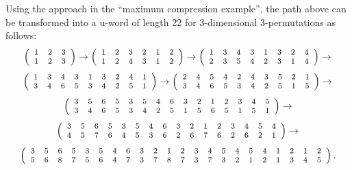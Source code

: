 \documentclass[12pt]{article}
\begin{document}
Using the approach in the ``maximum compression example'', the path above can be transformed into a u-word of length 22 for 3-dimensional 3-permutations as follows:
\begin{equation*}
{\footnotesize
\left(\begin{array}{ccc}
1& 2 & 3\\
1 & 2 & 3 
\end{array}\right)
\rightarrow
\left(\begin{array}{cccccc}
1 & 2 & 3 & 2 & 1 & 2 \\
1 & 2 & 4 & 3 & 1 & 2
\end{array}\right)
\rightarrow
\left(\begin{array}{cccccccc}
1 & 3 & 4 & 3 & 1 & 3 & 2 & 4 \\
2 & 3 & 5 & 4 & 2 & 3 & 1 & 4 
\end{array}\right)
\rightarrow
}\end{equation*}
\begin{equation*}
{\footnotesize
\left(\begin{array}{ccccccccc}
1 & 3 & 4 & 3 & 1 & 3 & 2 & 4 & 1\\
3 & 4 & 6 & 5 & 3 & 4 & 2 & 5 & 1
\end{array}\right)
\rightarrow
\left(\begin{array}{cccccccccc}
2 & 4 & 5 & 4 & 2 & 4 & 3 & 5 & 2 & 1\\
3 & 4 & 6 & 5 & 3 & 4 & 2 & 5 & 1 & 5
\end{array}\right)
\rightarrow
}\end{equation*}
\begin{equation*}
{\footnotesize
\left(\begin{array}{ccccccccccccccc}
3 & 5 & 6 & 5 & 3 & 5 & 4 & 6 & 3 & 2 & 1 & 2 & 3 & 4 & 5 \\
3 & 4 & 6 & 5 & 3 & 4 & 2 & 5 & 1 & 5 & 6 & 5 & 1 & 5 & 1 
\end{array}\right)
\rightarrow
}\end{equation*}
\begin{equation*}
{\footnotesize
\left(\begin{array}{cccccccccccccccc}
3 & 5 & 6 & 5 & 3 & 5 & 4 & 6 & 3 & 2 & 1 & 2 & 3 & 4 & 5 & 4\\
4 & 5 & 7 & 6 & 4 & 5 & 3 & 6 & 2 & 6 & 7 & 6 & 2 & 6 & 2 & 1
\end{array}\right)
\rightarrow
}
\end{equation*}  
\begin{equation*}
{\footnotesize
\left(\begin{array}{cccccccccccccccccccccc}
3 & 5 & 6 & 5 & 3 & 5 & 4 & 6 & 3 & 2 & 1 & 2 & 3 & 4 & 5 & 4 & 5 & 4 & 1 & 2 & 1 & 2 \\
5 & 6 & 8 & 7 & 5 & 6 & 4 & 7 & 3 & 7 & 8 & 7 & 3 & 7 & 3 & 2 & 1 & 2 & 1 & 3 & 4 & 5
\end{array}\right).
}
\end{equation*}  
\end{document}
